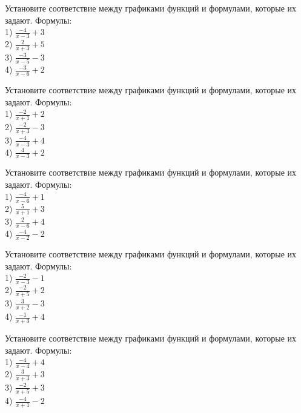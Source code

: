 \documentclass[4apaper]{article}
\begin{document}
\begin{taskBN}{71}
Установите соответствие между графиками функций и формулами, которые их задают. Формулы: \\1) $\frac{-4}{x-3}+3$\\2) $\frac{2}{x+3}+5$\\3) $\frac{-3}{x-5}-3$\\4) $\frac{-3}{x-6}+2$
\end{taskBN}

\begin{taskBN}{72}
Установите соответствие между графиками функций и формулами, которые их задают. Формулы: \\1) $\frac{-2}{x+1}+2$\\2) $\frac{-2}{x+3}-3$\\3) $\frac{-4}{x-3}+4$\\4) $\frac{4}{x-3}+2$
\end{taskBN}

\begin{taskBN}{73}
Установите соответствие между графиками функций и формулами, которые их задают. Формулы: \\1) $\frac{-4}{x-6}+1$\\2) $\frac{5}{x+1}+3$\\3) $\frac{2}{x-6}+4$\\4) $\frac{-4}{x-2}-2$
\end{taskBN}

\begin{taskBN}{74}
Установите соответствие между графиками функций и формулами, которые их задают. Формулы: \\1) $\frac{-2}{x-3}-1$\\2) $\frac{-2}{x+5}+2$\\3) $\frac{3}{x+2}-3$\\4) $\frac{-1}{x+3}+4$
\end{taskBN}

\begin{taskBN}{75}
Установите соответствие между графиками функций и формулами, которые их задают. Формулы: \\1) $\frac{-4}{x-4}+4$\\2) $\frac{3}{x+3}+3$\\3) $\frac{-2}{x+5}+3$\\4) $\frac{-4}{x+1}-2$
\end{taskBN}
\end{document}
